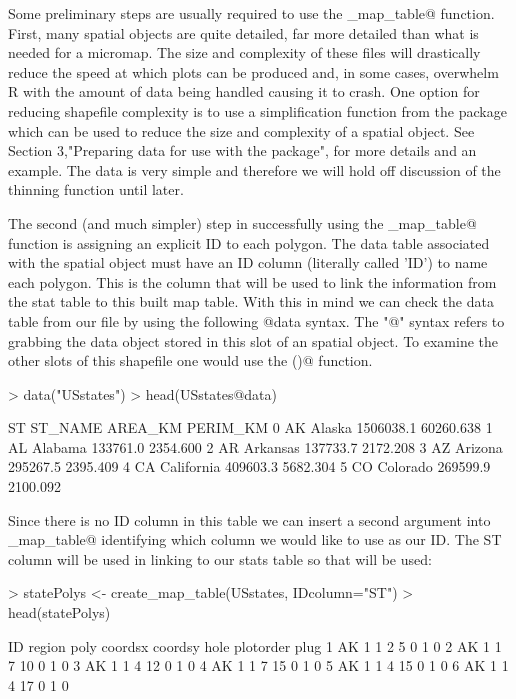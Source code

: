\documentclass{article}
\newcommand{\R}{{\normalfont\textsf{R }}{}}
\begin{document}
Some preliminary steps are usually required to use the \verb@create_map_table@ function. First, many spatial objects are quite detailed, far more detailed than what is needed for a micromap. The size and complexity of these files will drastically reduce the speed at which plots can be produced and, in some cases, overwhelm \R with the amount of data being handled causing it to crash. One option for reducing shapefile complexity is to use a simplification function from the \verb@sf@ package which can be used to reduce the size and complexity of a spatial object.  See Section 3,"Preparing data for use with the package", for more details and an example.  The \verb@USstates@ data is very simple and therefore we will hold off discussion of the thinning function until later.

The second (and much simpler) step in successfully using the \verb@create_map_table@ function is assigning an explicit ID to each polygon. The data table associated with the spatial object must have an ID column (literally called 'ID') to name each polygon. This is the column that will be used to link the information from the stat table to this built map table. With this in mind we can check the data table from our \verb@USstates@ file by using the following @data syntax. The "@" syntax refers to grabbing the data object stored in this slot of an \verb@sp@ spatial object. To examine the other slots of this shapefile one would use the \verb@slotNames()@ function.

\begin{Schunk}
\begin{Sinput}
> data("USstates") 
> head(USstates@data)
\end{Sinput}
\begin{Soutput}
  ST    ST_NAME   AREA_KM  PERIM_KM
0 AK     Alaska 1506038.1 60260.638
1 AL    Alabama  133761.0  2354.600
2 AR   Arkansas  137733.7  2172.208
3 AZ    Arizona  295267.5  2395.409
4 CA California  409603.3  5682.304
5 CO   Colorado  269599.9  2100.092
\end{Soutput}
\end{Schunk}

Since there is no ID column in this table we can insert a second argument into \verb@create_map_table@ identifying which column we would like to use as our ID. The ST column will be used in linking to our stats table so that will be used:

\begin{Schunk}
\begin{Sinput}
> statePolys <- create_map_table(USstates, IDcolumn="ST") 
> head(statePolys) 
\end{Sinput}
\begin{Soutput}
  ID region poly coordsx coordsy hole plotorder plug
1 AK      1    1       2       5    0         1    0
2 AK      1    1       7      10    0         1    0
3 AK      1    1       4      12    0         1    0
4 AK      1    1       7      15    0         1    0
5 AK      1    1       4      15    0         1    0
6 AK      1    1       4      17    0         1    0
\end{Soutput}
\end{Schunk}
\end{document}
